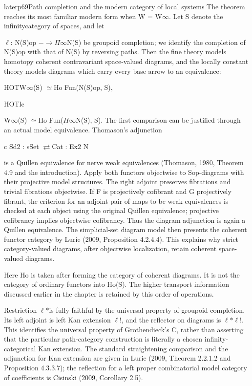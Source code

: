 \begin{dcomment}{later}{p69}{Path completion and the modern category of local systems}
The theorem reaches its most familiar modern form when W = W\ensuremath{\infty}. Let S denote the infinitycategory of spaces, and let

\ensuremath{\ell}: N(S)op \ensuremath{-}\ensuremath{\to}\ensuremath{\Pi}\ensuremath{\infty}N(S) be groupoid completion; we identify the completion of N(S)op with that of N(S) by reversing paths. Then the fine theory models homotopy coherent contravariant space-valued diagrams, and the locally constant theory models diagrams which carry every base arrow to an equivalence:

HOTW\ensuremath{\infty}(S) \ensuremath{\simeq}Ho Fun(N(S)op, S),

HOTlc

W\ensuremath{\infty}(S) \ensuremath{\simeq}Ho Fun(\ensuremath{\Pi}\ensuremath{\infty}N(S), S). The first comparison can be justified through an actual model equivalence. Thomason’s adjunction

c Sd2 : sSet \ensuremath{\rightleftarrows}Cat : Ex2 N

is a Quillen equivalence for nerve weak equivalences (Thomason, 1980, Theorem 4.9 and the introduction). Apply both functors objectwise to Sop-diagrams with their projective model structures. The right adjoint preserves fibrations and trivial fibrations objectwise. If F is projectively cofibrant and G projectively fibrant, the criterion for an adjoint pair of maps to be weak equivalences is checked at each object using the original Quillen equivalence; projective cofibrancy implies objectwise cofibrancy. Thus the diagram adjunction is again a Quillen equivalence. The simplicial-set diagram model then presents the coherent functor category by Lurie (2009, Proposition 4.2.4.4). This explains why strict category-valued diagrams, after objectwise localization, retain coherent space-valued diagrams.

Here Ho is taken after forming the category of coherent diagrams. It is not the category of ordinary functors into Ho(S). The higher transport information discussed earlier in the chapter is retained by this order of operations.

Restriction \ensuremath{\ell}\ensuremath{*}is fully faithful by the universal property of groupoid completion. Its left adjoint is left Kan extension \ensuremath{\ell}!, and the reflector on diagrams is \ensuremath{\ell}\ensuremath{*}\ensuremath{\ell}!. This identifies the universal property of Grothendieck’s C, rather than asserting that the particular path-category construction is literally a chosen infinity-categorical Kan extension. The standard straightening comparison and the adjunction for Kan extension are given in Lurie (2009, Theorem 2.2.1.2 and Proposition 4.3.3.7); the reflection for a left proper combinatorial model category of coefficients is Cisinski (2009, Corollary 2.5).


\end{dcomment}
